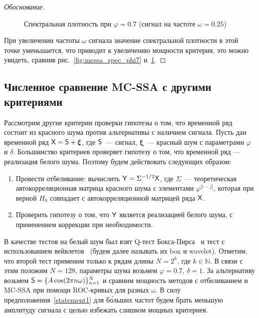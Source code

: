 \documentclass[specialist,
substylefile = spbu_report.rtx,
subf,href,colorlinks=true, 12pt]{disser}
\theoremstyle{definition}
\newtheorem{remark}{Замечание}
\newcommand{\bfxi}{\boldsymbol{\xi}}
\begin{document}
\begin{proof}[Обоснование]
\begin{figure}[H]
			\caption{Спектральная плотность при $\varphi=0.7$ (сигнал на частоте $\omega=0.25$)}
			\label{fig:mcssa_spec_phi7_omega025}
		\end{figure}
		При увеличении частоты $\omega$ сигнала значение спектральной плотности в этой точке уменьшается, что приводит к увеличению мощности критерия, это можно увидеть, сравнив рис.~\ref{fig:mcssa_spec_phi7} и~\ref{fig:mcssa_spec_phi7_omega025}.
	\end{proof}


\subsection{Численное сравнение MC-SSA с другими критериями}\label{sect:mc-ssa_comparison}
Рассмотрим другие критерии проверки гипотезы о том, что временной ряд состоит из красного шума против альтернативы с наличием сигнала. Пусть дан временной ряд $\tX=\tS+\bfxi$, где $\mathsf{S}$~--- сигнал, $\bfxi$~--- красный шум с параметрами $\varphi$ и $\delta$. Большинство критериев проверяет гипотезу о том, что временной ряд --- реализация белого шума. Поэтому будем действовать следующих образом:
\begin{enumerate}
	\item Провести отбеливание: вычислить $\mathsf{Y}=\Sigma^{-1/2}\mathsf{X}$, где $\Sigma$~--- теоретическая автокорреляционная матрица красного шума с элементами $\varphi^{|i-j|}$, которая при верной $H_0$ совпадает с автокорреляционной матрицей ряда $\mathsf{X}$.
	\item Проверить гипотезу о том, что $\mathsf{Y}$ является реализацией белого шума, с применением коррекции при необходимости.
\end{enumerate}
В качестве тестов на белый шум был взят Q-тест Бокса-Пирса~\cite{box-pierce} и тест с использованием вейвлетов~\cite{wavelet} (будем далее называть их box и wavelet). Отметим, что второй тест применим только к рядам длины $N=2^k$, где $k\in\mathbb{N}$. В связи с этим положим $N=128$, параметры шума возьмем $\varphi=0.7$, $\delta=1$. За альтернативу возьмем $\mathsf{S}=\{A\cos(2\pi n\omega)\}_{n=1}^N$ и сравним мощность методов с отбеливанием и MC-SSA при помощи ROC-кривых для разных $\omega$. В силу предположения~\ref{statement1} для б\'{о}льших частот будем брать меньшую амплитуду сигнала с целью избежать слишком мощных критериев.
\end{document}
